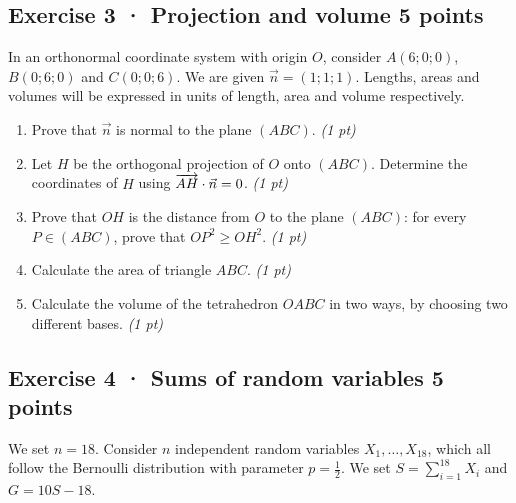 \clearpage{}\par

\subsection*{Exercise 3 · Projection and volume \hfill 5 points}In an orthonormal coordinate system with origin $O$, consider $A(6;0;0)$, $B(0;6;0)$ and $C(0;0;6)$. We are given $\vec n=(1;1;1)$. Lengths, areas and volumes will be expressed in units of length, area and volume respectively.

\begin{enumerate}

\item Prove that $\vec n$ is normal to the plane $(ABC)$. \hfill\textit{(1 pt)}

\item Let $H$ be the orthogonal projection of $O$ onto $(ABC)$. Determine the coordinates of $H$ using $\overrightarrow{AH}\cdot\vec n=0$. \hfill\textit{(1 pt)}

\item Prove that $OH$ is the distance from $O$ to the plane $(ABC)$: for every $P\in(ABC)$, prove that $OP^2\ge OH^2$. \hfill\textit{(1 pt)}

\item Calculate the area of triangle $ABC$. \hfill\textit{(1 pt)}

\item Calculate the volume of the tetrahedron $OABC$ in two ways, by choosing two different bases. \hfill\textit{(1 pt)}

\end{enumerate}

\subsection*{Exercise 4 · Sums of random variables \hfill 5 points}We set $n=18$. Consider $n$ independent random variables $X_1,\ldots,X_{18}$, which all follow the Bernoulli distribution with parameter $p=\frac{1}{2}$. We set $S=\displaystyle\sum_{i=1}^{18}X_i$ and $G=10S-18$.

